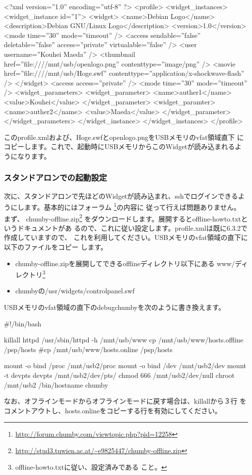 \documentclass[mingoth,a4paper]{jsarticle}
\begin{document}
\begin{commandline}
<?xml version=''1.0'' encoding=''utf-8'' ?>
<profile>
 <widget_instances>
  <widget_instance id=''1''>
   <widget>
    <name>Debian Logo</name>
    <description>Debian GNU/Linux Logo</description>
    <version>1.0</version>
    <mode time=''30'' mode=''timeout'' />
    <access sendable=''false'' deletable=''false''
     access=''private'' virtualable=''false'' />
    <user username=''Kouhei Maeda'' />
    <thumbnail href=''file:////mnt/usb/openlogo.png''
     contenttype=''image/png'' />
    <movie href=''file:////mnt/usb/Hoge.swf''
     contenttype=''application/x-shockwave-flash'' />
   </widget>
   <access access=''private'' />
   <mode time=''30'' mode=''timeout'' />
   <widget_parameters>
    <widget_parameter>
     <name>auther1</name>
     <value>Kouhei</value>
    </widget_parameter>
    <widget_paramter>
     <name>auther2</name>
     <value>Maeda</value>
    </widget_parameter>
   </widget_parameters>
  </widget_instance>
 </widget_instances>
</profile>
\end{commandline}
このprofile.xmlおよび、Hoge.swfとopenlogo.pngをUSBメモリのvfat領域直下
にコピーします。これで、起動時にUSBメモリからこのWidgetが読み込まれるよ
うになります。

\subsubsection{スタンドアロンでの起動設定}
次に、スタンドアロンで先ほどのWidgetが読み込まれ、sshでログインできるよ
うにします。基本的にはフォーラム
\footnote{\url{http://forum.chumby.com/viewtopic.php?pid=12258}}の内容に
従って行えば問題ありません。
まず、
chumby-offline.zip\footnote{\url{http://stud3.tuwien.ac.at/~e9825447/chumby-offline.zip}}
をダウンロードします。展開するとoffline-howto.txtというドキュメントがあ
るので、これに従い設定します。profile.xmlは既に6.3.2で作成していますので、
これを利用してください。USBメモリのvfat領域の直下に以下のファイルをコピー
します。
\begin{itemize}
\item chumby-offline.zipを展開してできるofflineディレクトリ以下にある
      www/ディレクトリ\footnote{offline-howto.txtに従い、設定済みである
      こと。}
\item chumbyの/usr/widgets/controlpanel.swf
\end{itemize}
USBメモリのvfat領域の直下のdebugchumbyを次のように書き換えます。
\begin{commandline}
#!/bin/bash

killall httpd
/usr/sbin/httpd -h /mnt/usb/www
cp /mnt/usb/www/hosts.offline /psp/hosts
#cp /mnt/usb/www/hosts.online /psp/hosts

mount -o bind /proc /mnt/usb2/proc
mount -o bind /dev  /mnt/usb2/dev
mount -t devpts devpts /mnt/usb2/dev/pts/
chmod 666 /mnt/usb2/dev/null
chroot /mnt/usb2 /bin/hostname chumby
\end{commandline}
なお、オフラインモードからオフラインモードに戻す場合は、killallから３行
をコメントアウトし、hosts.onlineをコピーする行を有効にしてください。
\end{document}
